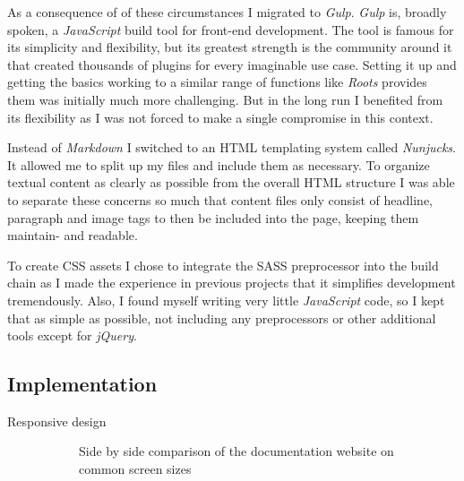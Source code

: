 As a consequence of of these circumstances I migrated to \textit{Gulp}. \textit{Gulp} is, broadly spoken, a \textit{JavaScript} build tool for front-end development. The tool is famous for its simplicity and flexibility, but its greatest strength is the community around it that created thousands of plugins for every imaginable use case. Setting it up and getting the basics working to a similar range of functions like \textit{Roots} provides them was initially much more challenging. But in the long run I benefited from its flexibility as I was not forced to make a single compromise in this context.

Instead of \textit{Markdown} I switched to an \ac{HTML} templating system called \textit{Nunjucks}. It allowed me to split up my files and include them as necessary. To organize textual content as clearly as possible from the overall \ac{HTML} structure I was able to separate these concerns so much that content files only consist of headline, paragraph and image tags to then be included into the page, keeping them maintain- and readable.

To create \ac{CSS} assets I chose to integrate the \ac{SASS} preprocessor into the build chain as I made the experience in previous projects that it simplifies development tremendously. Also, I found myself writing very little \textit{JavaScript} code, so I kept that as simple as possible, not including any preprocessors or other additional tools except for \textit{jQuery}.

\subsection{Implementation}

\begin{description}

	\item[Responsive design]\hfill
	
	\begin{figure}[h]
		\caption{Side by side comparison of the documentation website on common screen sizes}
	\end{figure}

\end{description}